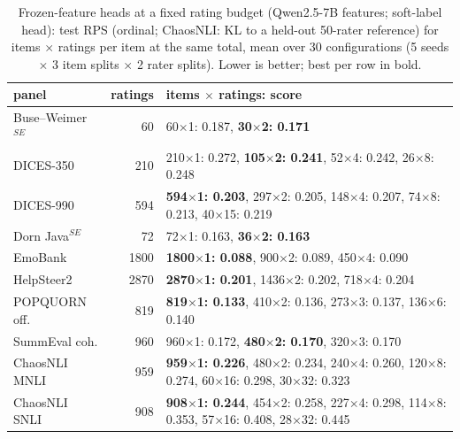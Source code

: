 \begin{table}[t]\centering\footnotesize
\caption{Frozen-feature heads at a fixed rating budget (Qwen2.5-7B features; soft-label head): test RPS (ordinal; ChaosNLI: KL to a held-out 50-rater reference) for items $\times$ ratings per item at the same total, mean over 30 configurations (5 seeds $\times$ 3 item splits $\times$ 2 rater splits). Lower is better; best per row in bold.}\label{tab:heads}
\begin{tabular}{lrl}\toprule panel & ratings & items $\times$ ratings: score \\\midrule
Buse--Weimer$^{SE}$ & 60 & 60$\times$1: 0.187, \textbf{30$\times$2: 0.171} \\
DICES-350 & 210 & 210$\times$1: 0.272, \textbf{105$\times$2: 0.241}, 52$\times$4: 0.242, 26$\times$8: 0.248 \\
DICES-990 & 594 & \textbf{594$\times$1: 0.203}, 297$\times$2: 0.205, 148$\times$4: 0.207, 74$\times$8: 0.213, 40$\times$15: 0.219 \\
Dorn Java$^{SE}$ & 72 & 72$\times$1: 0.163, \textbf{36$\times$2: 0.163} \\
EmoBank & 1800 & \textbf{1800$\times$1: 0.088}, 900$\times$2: 0.089, 450$\times$4: 0.090 \\
HelpSteer2 & 2870 & \textbf{2870$\times$1: 0.201}, 1436$\times$2: 0.202, 718$\times$4: 0.204 \\
POPQUORN off. & 819 & \textbf{819$\times$1: 0.133}, 410$\times$2: 0.136, 273$\times$3: 0.137, 136$\times$6: 0.140 \\
SummEval coh. & 960 & 960$\times$1: 0.172, \textbf{480$\times$2: 0.170}, 320$\times$3: 0.170 \\
ChaosNLI MNLI & 959 & \textbf{959$\times$1: 0.226}, 480$\times$2: 0.234, 240$\times$4: 0.260, 120$\times$8: 0.274, 60$\times$16: 0.298, 30$\times$32: 0.323 \\
ChaosNLI SNLI & 908 & \textbf{908$\times$1: 0.244}, 454$\times$2: 0.258, 227$\times$4: 0.298, 114$\times$8: 0.353, 57$\times$16: 0.408, 28$\times$32: 0.445 \\
\bottomrule\end{tabular}\end{table}